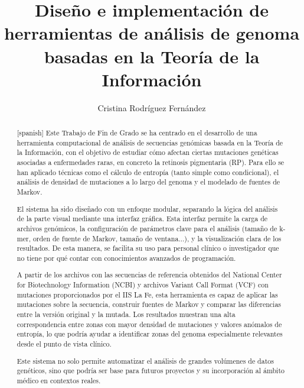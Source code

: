 \documentclass[11pt,spanish,listoffigures,listoftables]{tfgetsinf}
\title{Diseño e implementación de herramientas de análisis de genoma basadas en la Teoría de la Información}
\author{Cristina Rodríguez Fernández}
\begin{document}

\begin{abstract}[spanish]
   Este Trabajo de Fin de Grado se ha centrado en el desarrollo de una herramienta computacional de análisis de secuencias genómicas basada en la Teoría de la Información, con el objetivo de estudiar cómo afectan ciertas mutaciones genéticas asociadas a enfermedades raras, en concreto la retinosis pigmentaria (RP). Para ello se han aplicado técnicas como el cálculo de entropía (tanto simple como condicional), el análisis de densidad de mutaciones a lo largo del genoma y el modelado de fuentes de Markov. 

   El sistema ha sido diseñado con un enfoque modular, separando la lógica del análisis de la parte visual mediante una interfaz gráfica. Esta interfaz permite la carga de archivos genómicos, la configuración de parámetros clave para el análisis (tamaño de k-mer, orden de fuente de Markov, tamaño de ventana...), y la visualización clara de los resultados. De esta manera, se facilita su uso para personal clínico o investigador que no tiene por qué contar con conocimientos avanzados de programación. 

   A partir de los archivos con las secuencias de referencia obtenidos del National Center for Biotechnology Information (NCBI) y archivos Variant Call Format (VCF) con mutaciones proporcionados por el IIS La Fe, esta herramienta es capaz de aplicar las mutaciones sobre la secuencia, construir fuentes de Markov y comparar las diferencias entre la versión original y la mutada. Los resultados muestran una alta correspondencia entre zonas con mayor densidad de mutaciones y valores anómalos de entropía, lo que podría ayudar a identificar zonas del genoma especialmente relevantes desde el punto de vista clínico. 

   Este sistema no solo permite automatizar el análisis de grandes volúmenes de datos genéticos, sino que podría ser base para futuros proyectos y su incorporación al ámbito médico en contextos reales. 
   \\
   \\
\end{abstract}
\end{document}
